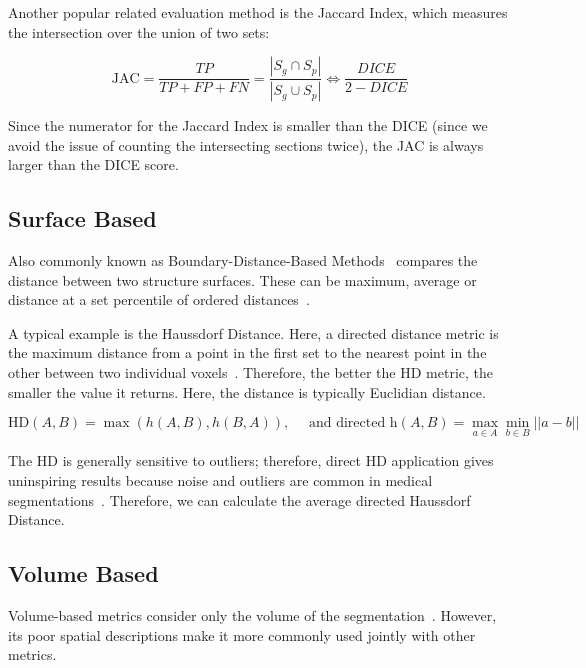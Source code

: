 \documentclass[11pt,twoside]{report}
\begin{document}
Another popular related evaluation method is the Jaccard Index, which measures the intersection over the union of two sets:

\begin{equation*}
 \text{JAC} = \frac{TP}{TP+FP+FN} = \frac{|S_g\cap S_p|}{|S_g \cup S_p|} \iff \frac{DICE}{2 - DICE}
\end{equation*}

Since the numerator for the Jaccard Index is smaller than the DICE (since we avoid the issue of counting the intersecting sections twice), the JAC is always larger than the DICE score.

\subsection{Surface Based}\label{sect:surface-based}

Also commonly known as Boundary-Distance-Based Methods~\cite{boundary-overlap-metrics} compares the distance between two structure
surfaces. These can be maximum, average or distance at a set percentile of ordered distances~\cite{evaluation-metrics}.

A typical example is the Haussdorf Distance. Here, a directed distance metric is the maximum distance from a point in the first set to the nearest point in the other between two individual voxels~\cite{boundary-overlap-metrics}. Therefore, the better the HD metric, the smaller the value it returns. Here, the distance is typically Euclidian distance.

\begin{equation*}
 \text{HD}(A,B) = \max(h(A,B), h(B,A)), \quad \text{ and directed h}(A,B)=\max_{a\in A}\min_{b \in B} ||a-b||
\end{equation*}

The HD is generally sensitive to outliers; therefore, direct HD application gives uninspiring results because noise and outliers are common in medical segmentations~\cite{boundary-overlap-metrics}. Therefore, we can calculate the average directed Haussdorf Distance.

\subsection{Volume Based}

Volume-based metrics consider only the volume of the segmentation~\cite{evaluation-of-metrics-in-prostate,review-metrics, boundary-overlap-metrics}. However, its poor spatial descriptions make it more commonly used jointly with other metrics.
\end{document}
